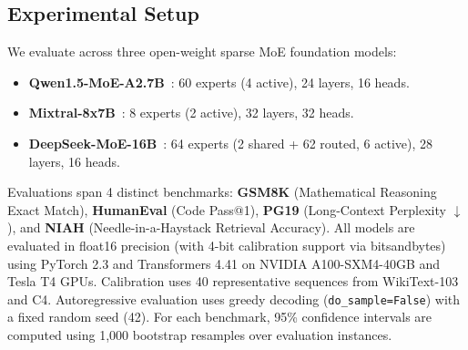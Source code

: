 \documentclass[runningheads]{llncs}
\begin{document}
\subsection{Experimental Setup}
We evaluate across three open-weight sparse MoE foundation models:
\begin{itemize}
    \item \textbf{Qwen1.5-MoE-A2.7B}~\cite{bai2024qwenmoe}: 60 experts (4 active), 24 layers, 16 heads.
    \item \textbf{Mixtral-8x7B}~\cite{jiang2024mixtral}: 8 experts (2 active), 32 layers, 32 heads.
    \item \textbf{DeepSeek-MoE-16B}~\cite{dai2024deepseekmoe}: 64 experts (2 shared + 62 routed, 6 active), 28 layers, 16 heads.
\end{itemize}
Evaluations span 4 distinct benchmarks: \textbf{GSM8K} (Mathematical Reasoning Exact Match), \textbf{HumanEval} (Code Pass@1), \textbf{PG19} (Long-Context Perplexity $\downarrow$), and \textbf{NIAH} (Needle-in-a-Haystack Retrieval Accuracy). All models are evaluated in float16 precision (with 4-bit calibration support via bitsandbytes) using PyTorch 2.3 and Transformers 4.41 on NVIDIA A100-SXM4-40GB and Tesla T4 GPUs. Calibration uses 40 representative sequences from WikiText-103 and C4. Autoregressive evaluation uses greedy decoding (\texttt{do\_sample=False}) with a fixed random seed (42). For each benchmark, 95\% confidence intervals are computed using 1,000 bootstrap resamples over evaluation instances.
\end{document}
